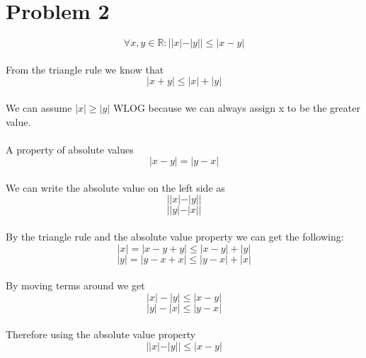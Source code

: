 \documentclass{article}
\begin{document}
\section{Problem 2}
$$\forall x,y \in \mathbb{R} : ||x|-|y|| \leq |x-y|$$
\\From the triangle rule we know that $$|x+y|\leq |x|+|y|$$
\\We can assume $|x| \geq |y|$ WLOG because we can always assign x to be the greater value.
\\
\\A property of absolute values $$|x-y| = |y-x|$$
\\We can write the absolute value on the left side as $$||x|-|y||$$ $$||y|-|x||$$
\\By the triangle rule and the absolute value property we can get the following: $$|x|=|x-y+y|\leq|x-y|+|y|$$ $$|y|=|y-x+x|\leq|y-x|+|x|$$
\\By moving terms around we get $$|x|-|y|\leq|x-y|$$ $$|y|-|x|\leq|y-x|$$
\\Therefore using the absolute value property $$||x|-|y||\leq|x-y|$$
\end{document}
